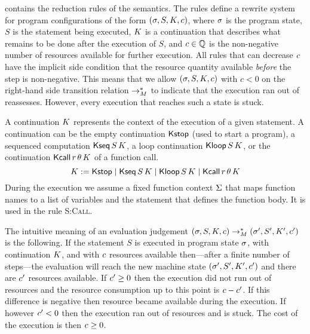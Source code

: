 \documentclass[nocopyrightspace,preprint]{sigplanconf}
\newcommand{\pref}[1]{\prettyref{#1}}
\begin{document}
\pref{fig:opsem} contains the reduction rules of the semantics.  The
rules define a rewrite system for program configurations of the form
$(\sigma, S, K, c)$, where $\sigma$ is the program state, $S$
is the statement being executed, $K$ is a continuation that
describes what remains to be done after the execution of $S$, and
$c \in \mathbb{Q}$ is the non-negative number of resources available for
further execution.  All rules that can decrease $c$ have the
implicit side condition that the resource quantity available
\emph{before} the step is non-negative.  This means that we allow
$(\sigma, S, K, c)$ with $c<0$ on the right-hand side
transition relation $\to_{M}^*$ to indicate that the execution
ran out of reassesses.  However, every execution that reaches such a
state is stuck.

A continuation $K$ represents the context of the execution of a
given statement.  A continuation can be the empty continuation
$\mathsf{Kstop}$ (used to start a program), a sequenced computation $\mathsf{Kseq}\, S \, K$, a loop continuation $\mathsf{Kloop}\, S \, K$, or the continuation
$\mathsf{Kcall}\, r \, \theta \, K$ of a function call.
$$
K := \mathsf{Kstop}
\mid \mathsf{Kseq}\, S \, K
\mid \mathsf{Kloop}\, S \, K
\mid \mathsf{Kcall}\, r \, \theta \, K
$$
%
During the execution we assume a fixed function context $\Sigma$ that
maps function names to a list of variables and the statement that
defines the function body.  It is used in the rule \textsc{S:Call}.

The intuitive meaning of an evaluation judgement $(\sigma, S, K,
c) \to_{M}^* (\sigma', S', K', c')$ is the
following.  If the statement $S$ is executed in program state
$\sigma$, with continuation $K$, and with $c$ resources
available then---after a finite number of steps---the evaluation will
reach the new machine state $(\sigma', S', K',c')$ and there
are $c'$ resources available.  If $c' \ge 0$ then the
execution did not run out of resources and the resource consumption up
to this point is $c - c'$.  If this difference is negative
then resource became available during the execution.  If however
$c' < 0$ then the execution ran out of resources and is stuck.
The cost of the execution is then $c \ge 0$.
\end{document}
